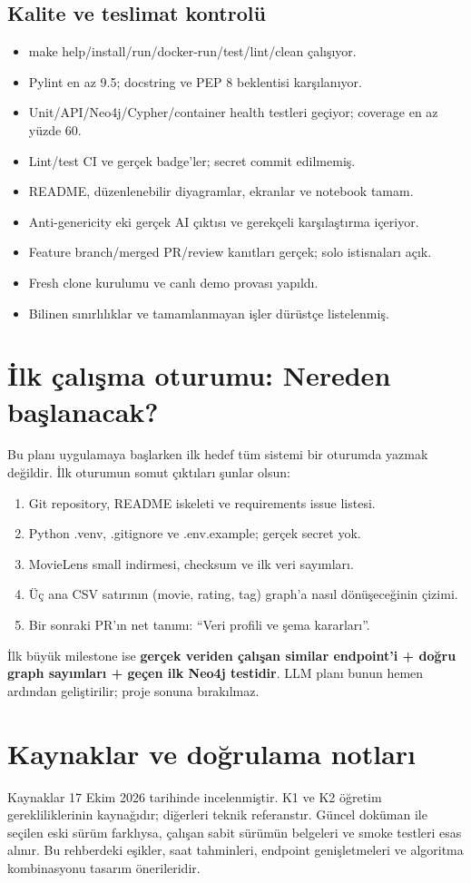 \documentclass[11pt,a4paper]{article}
\newcommand{\checkitem}{\item[$\square$]}
\begin{document}
\subsection{Kalite ve teslimat kontrolü}
\begin{itemize}
\checkitem make help/install/run/docker-run/test/lint/clean çalışıyor.
\checkitem Pylint en az 9.5; docstring ve PEP 8 beklentisi karşılanıyor.
\checkitem Unit/API/Neo4j/Cypher/container health testleri geçiyor; coverage en az yüzde 60.
\checkitem Lint/test CI ve gerçek badge'ler; secret commit edilmemiş.
\checkitem README, düzenlenebilir diyagramlar, ekranlar ve notebook tamam.
\checkitem Anti-genericity eki gerçek AI çıktısı ve gerekçeli karşılaştırma içeriyor.
\checkitem Feature branch/merged PR/review kanıtları gerçek; solo istisnaları açık.
\checkitem Fresh clone kurulumu ve canlı demo provası yapıldı.
\checkitem Bilinen sınırlılıklar ve tamamlanmayan işler dürüstçe listelenmiş.
\end{itemize}

\section{İlk çalışma oturumu: Nereden başlanacak?}
Bu planı uygulamaya başlarken ilk hedef tüm sistemi bir oturumda yazmak değildir. İlk oturumun somut çıktıları şunlar olsun:
\begin{enumerate}
\item Git repository, README iskeleti ve requirements issue listesi.
\item Python .venv, .gitignore ve .env.example; gerçek secret yok.
\item MovieLens small indirmesi, checksum ve ilk veri sayımları.
\item Üç ana CSV satırının (movie, rating, tag) graph'a nasıl dönüşeceğinin çizimi.
\item Bir sonraki PR'ın net tanımı: ``Veri profili ve şema kararları''.
\end{enumerate}
İlk büyük milestone ise \textbf{gerçek veriden çalışan similar endpoint'i + doğru graph sayımları + geçen ilk Neo4j testidir}. LLM planı bunun hemen ardından geliştirilir; proje sonuna bırakılmaz.

\clearpage
\section{Kaynaklar ve doğrulama notları}
Kaynaklar 17 Ekim 2026 tarihinde incelenmiştir. K1 ve K2 öğretim gerekliliklerinin kaynağıdır; diğerleri teknik referanstır. Güncel doküman ile seçilen eski sürüm farklıysa, çalışan sabit sürümün belgeleri ve smoke testleri esas alınır. Bu rehberdeki eşikler, saat tahminleri, endpoint genişletmeleri ve algoritma kombinasyonu tasarım önerileridir.
\end{document}
